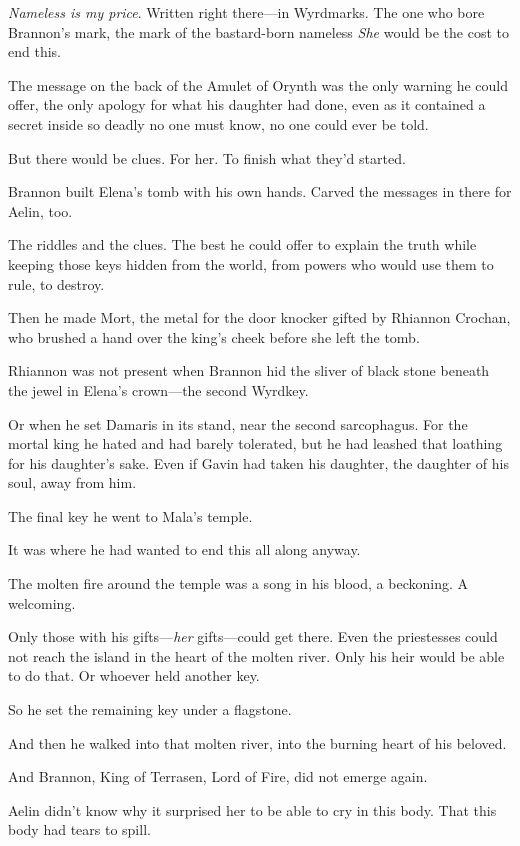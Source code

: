 \emph{Nameless is my price}. Written right there---in Wyrdmarks. The one who bore Brannon's mark, the mark of the bastard-born nameless 
\emph{She} would be the cost to end this.

The message on the back of the Amulet of Orynth was the only warning he could offer, the only apology for what his daughter had done, even as it contained a secret inside so deadly no one must know, no one could ever be told.

But there would be clues. For her. To finish what they'd started.

Brannon built Elena's tomb with his own hands. Carved the messages in there for Aelin, too.

The riddles and the clues. The best he could offer to explain the truth while keeping those keys hidden from the world, from powers who would use them to rule, to destroy.

Then he made Mort, the metal for the door knocker gifted by Rhiannon Crochan, who brushed a hand over the king's cheek before she left the tomb.

Rhiannon was not present when Brannon hid the sliver of black stone beneath the jewel in Elena's crown---the second Wyrdkey.

Or when he set Damaris in its stand, near the second sarcophagus. For the mortal king he hated and had barely tolerated, but he had leashed that loathing for his daughter's sake. Even if Gavin had taken his daughter, the daughter of his soul, away from him.

The final key  he went to Mala's temple.

It was where he had wanted to end this all along anyway.

The molten fire around the temple was a song in his blood, a beckoning. A welcoming.

Only those with his gifts---\emph{her} gifts---could get there. Even the priestesses could not reach the island in the heart of the molten river. Only his heir would be able to do that. Or whoever held another key.

So he set the remaining key under a flagstone.

And then he walked into that molten river, into the burning heart of his beloved.

And Brannon, King of Terrasen, Lord of Fire, did not emerge again.

Aelin didn't know why it surprised her to be able to cry in this body. That this body had tears to spill.

